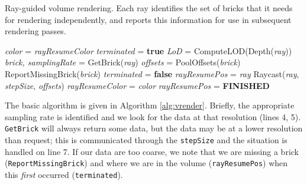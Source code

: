\begin{algorithm}
  \caption{Ray-guided volume rendering.  Each ray identifies the
  set of bricks that it needs for rendering independently, and
  reports this information for use in subsequent rendering passes.}
  \label{alg:vrender}
  \begin{algorithmic}[1]
  \State \textit{color} = \textit{rayResumeColor}
  \State \textit{terminated} = \textbf{true} 
  \Repeat
    \State \textit{LoD} = ComputeLOD(Depth(\textit{ray}))
    \State \textit{brick, samplingRate} = GetBrick(\textit{ray})
    \State \textit{offsets} = PoolOffsets(\textit{brick})
      \State ReportMissingBrick(\textit{brick})
       
        \State \textit{terminated} = \textbf{false}
        \State \textit{rayResumePos} = \textit{ray}
      \EndIf
    \EndIf
    \State Raycast(\textit{ray}, \textit{stepSize}, \textit{offsets})
  \State \textit{rayResumeColor} = \textit{color}
    \State \textit{rayResumePos} = \textbf{FINISHED}
  \EndIf
  \end{algorithmic}
\end{algorithm}

The basic algorithm is given in Algorithm \ref{alg:vrender}.  Briefly, the
appropriate sampling rate is identified and we look for the data at
that resolution (lines 4, 5).
\texttt{GetBrick} will always return some data, but the data may be at
a lower resolution than request; this is
communicated through the \texttt{stepSize} and the situation is handled
on line 7.  If our data are too coarse, we note that we are missing a
brick (\texttt{ReportMissingBrick}) and where we are in the volume
(\texttt{rayResumePos}) when
this \emph{first} occurred (\texttt{terminated}).



